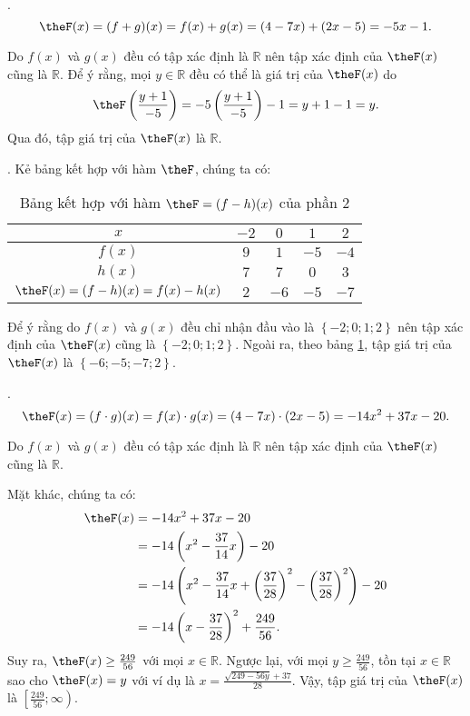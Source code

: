 \solution

\setcounter{subexercise}{1}
. 
$$
\theF(x) = (f + g)(x) = f(x) + g(x) = (4 - 7x) + (2x - 5) = -5x - 1.
$$

Do $f(x)$ và $g(x)$ đều có tập xác định là $\mathbb{R}$ nên tập xác định của $\theF(x)$ cũng là $\mathbb{R}$. Để ý rằng, mọi $y \in \mathbb{R}$ đều có thể là giá trị của $\theF(x)$ do $$
   \theF\left(\frac{y + 1}{-5}\right) = -5\left(\frac{y + 1}{-5}\right) - 1 = y + 1 - 1 = y.
$$ Qua đó, tập giá trị của $\theF(x)$ là $\mathbb{R}$.

. Kẻ bảng kết hợp với hàm $\theF$, chúng ta có:

\begin{table}[H]
   \centering
   \begin{tabular}{|c|c|c|c|c|}
      \hline
      $x$ & $-2$ & $0$ & $1$ & $2$ \\
      \hline
      $f(x)$ & $9$ & $1$ & $-5$ & $-4$ \\
      \hline
      $h(x)$ & $7$ & $7$ & $0$ & $3$ \\
      \hline
      $\theF(x) = (f - h)(x) = f(x) - h(x)$ & $2$ & $-6$ & $-5$ & $-7$ \\
      \hline
   \end{tabular}
   \caption{Bảng kết hợp với hàm $\theF= (f - h)(x)$ của phần 2}
   \label{tab:ham_so_mot_bien:phep_tinh_ham:theF_2}
\end{table}

Để ý rằng do $f(x)$ và $g(x)$ đều chỉ nhận đầu vào là $\left\{-2; 0; 1; 2\right\}$ nên tập xác định của $\theF(x)$ cũng là $\left\{-2; 0; 1; 2\right\}$. Ngoài ra, theo bảng \ref{tab:ham_so_mot_bien:phep_tinh_ham:theF_2}, tập giá trị của $\theF(x)$ là $\left\{-6; -5; -7; 2\right\}$.

.
$$
\theF(x) = (f \cdot g)(x) = f(x) \cdot g(x) = (4 - 7x) \cdot (2x - 5) = -14x^2 + 37x - 20.
$$

Do $f(x)$ và $g(x)$ đều có tập xác định là $\mathbb{R}$ nên tập xác định của $\theF(x)$ cũng là $\mathbb{R}$.

Mặt khác, chúng ta có:
\begin{align*}
   \theF(x) &= -14x^2 + 37x - 20\\
   &= -14\left(x^2 - \frac{37}{14}x\right) - 20\\
   &= -14\left(x^2 - \frac{37}{14}x + \left(\frac{37}{28}\right)^2 - \left(\frac{37}{28}\right)^2\right) - 20\\
   &= -14\left(x - \frac{37}{28}\right)^2 + \frac{249}{56}.
\end{align*}
Suy ra, $\theF(x) \ge \frac{249}{56}$ với mọi $x \in \mathbb{R}$. Ngược lại, với mọi $y \ge \frac{249}{56}$, tồn tại $x \in \mathbb{R}$ sao cho $\theF(x) = y$ với ví dụ là $\displaystyle x=\frac{\sqrt{249-56y}+37}{28}$. Vậy, tập giá trị của $\theF(x)$ là $\left[\frac{249}{56}; \infty\right)$.

